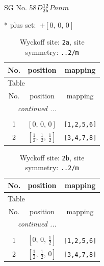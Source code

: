 \documentclass[fleqn,8pt]{jsarticle}
\begin{document}
\setcounter{MaxMatrixCols}{32}

\renewcommand{\tablename}{Table~}
\renewcommand{\figurename}{Figure~}
\begin{center}
\LARGE
SG No. 58\quad$D_{\rm 2h}^{12}$\quad$Pnnm$\quad[ orthorhombic ]
\end{center}
* plus set:\,\,\,$+\left[ 0,\, 0,\, 0 \right]$
\renewcommand{\arraystretch}{1.2}
\begin{longtable}{ccc}
\caption{Wyckoff site: {\tt 2a}, site symmetry: {\tt ..2/m}}
 \\
 \hline \hline
No. & position & mapping \\ \hline \endfirsthead

\multicolumn{2}{l}{\tablename\ \thetable{}} \\
 \hline \hline
No. & position & mapping \\ \hline \endhead

 \hline \hline
\multicolumn{2}{r}{\footnotesize\it continued ...} \\ \endfoot

 \hline \hline
\multicolumn{2}{r}{} \\ \endlastfoot

1 & $\left[ 0,\, 0,\, 0 \right]$ & {\tt [1,2,5,6]} \\ \hline
2 & $\left[ \frac{1}{2},\, \frac{1}{2},\, \frac{1}{2} \right]$ & {\tt [3,4,7,8]} \\
\end{longtable}
\renewcommand{\arraystretch}{1.2}
\begin{longtable}{ccc}
\caption{Wyckoff site: {\tt 2b}, site symmetry: {\tt ..2/m}}
 \\
 \hline \hline
No. & position & mapping \\ \hline \endfirsthead

\multicolumn{2}{l}{\tablename\ \thetable{}} \\
 \hline \hline
No. & position & mapping \\ \hline \endhead

 \hline \hline
\multicolumn{2}{r}{\footnotesize\it continued ...} \\ \endfoot

 \hline \hline
\multicolumn{2}{r}{} \\ \endlastfoot

1 & $\left[ 0,\, 0,\, \frac{1}{2} \right]$ & {\tt [1,2,5,6]} \\ \hline
2 & $\left[ \frac{1}{2},\, \frac{1}{2},\, 0 \right]$ & {\tt [3,4,7,8]} \\
\end{longtable}
\end{document}
